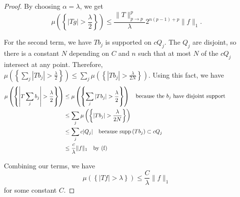 \documentclass[a4paper]{article}
\newcommand{\supp}[1]{\mathop{\mathrm{supp}}\left(#1\right)}
\begin{document}
\begin{enumerate}
\begin{proof}
    By choosing $\alpha = \lambda$, we get
    \[ \mu \left( \left\{ |Tg| > \frac{\lambda}{2} \right\} \right) \leq \frac{\|T\|_{p \to p}^p}{\lambda} 2^{n(p-1) + p} \|f\|_1 .\]

    For the second term, we have $Tb_j$ is supported on $c Q_j$. The $Q_j$ are disjoint, so there is a constant $N$ depending on $C$ and $n$ such that
    at most $N$ of the $c Q_j$ intersect at any point. Therefore, ${ \mu \left( \left\{ \sum_j |Tb_j| > \frac{\lambda}{2} \right \} \right) \leq \sum_j
    \mu \left( \left\{ |Tb_j| > \frac{\lambda}{2N} \right\} \right) }$. Using this fact, we have
    \begin{align*}
      \mu \left( \left\{ \left| T \sum_j b_j \right| > \frac{\lambda}{2} \right\} \right) &\leq \mu \left( \left\{ \sum_j | T b_j | >
        \frac{\lambda}{2} \right\} \right) \quad \parbox{7cm}{because the $b_j$ have disjoint support} \\
      &\leq \sum_j \mu \left( \left\{ |T b_j | > \frac{\lambda}{2N} \right\} \right) \\
      &\leq \sum_j c |Q_j| \quad \parbox{5cm}{because $\supp{Tb_j} \subset c Q_j$} \\
      &\leq \frac{c}{\lambda} \|f\|_1 \quad \parbox{5cm}{by (f)}
    \end{align*}

    Combining our terms, we have
    \[ \mu \left( \left\{ |Tf| > \lambda \right\} \right) \leq \frac{C}{\lambda} \|f\|_1 \]
    for some constant $C$.

  \end{proof}

\end{enumerate}
\end{document}
